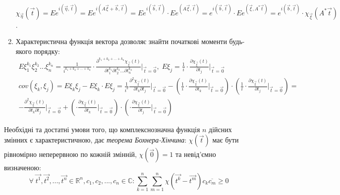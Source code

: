 \begin{enumerate}
    $\chi_{\vec{\eta}}(\vec{t}) = E e^{i(\vec{\eta}, \vec{t})} = E e^{i(A\vec{\xi} + \vec{b}, \vec{t})}=
    E e^{i(\vec{b}, \vec{t})} \cdot E e^{(A\vec{\xi}, \vec{t})} = e^{i(\vec{b}, \vec{t})} \cdot E e^{(\vec{\xi}, A^{*}\vec{t})} = e^{i(\vec{b}, \vec{t})} \cdot \chi_{\vec{\xi}}(A^{*}\vec{t})$.
    \item Характеристична функція вектора дозволяє знайти початкові моменти будь-якого порядку:
    \begin{gather*}
        E\xi_1^{k_1} \xi_2^{k_2} ... \xi_n^{k_n} = \frac{1}{i^{k_1 + k_2 + ... + k_n}} \cdot \frac{\partial^{k_1 + k_2 + ... + k_n}\chi_{\vec{\xi}}(t)}{\partial t_1^{k_1} \partial t_2^{k_2} ... \partial t_n^{k_n}} \Biggr \vert_{\vec{t} = \vec{0}}, 
        \; E\xi_j = \frac{1}{i} \cdot\frac{\partial \chi_{\vec{\xi}}(t)}{\partial t_j} \Biggr \vert_{\vec{t} = \vec{0}} \\
        {cov}(\xi_k, \xi_j) = E\xi_k\xi_j - E\xi_k\cdot E\xi_j = \frac{1}{i^2} \frac{\partial^2 \chi_{\vec{\xi}}(t)}{\partial t_k \partial t_j} \Biggr \vert_{\vec{t} = \vec{0}} - 
        \left( \frac{1}{i} \cdot\frac{\partial \chi_{\vec{\xi}}(t)}{\partial t_k} \Biggr \vert_{\vec{t} = \vec{0}}\right) \cdot \left( \frac{1}{i} \cdot\frac{\partial \chi_{\vec{\xi}}(t)}{\partial t_j} \Biggr \vert_{\vec{t} = \vec{0}}\right) = \\
        -\frac{\partial^2 \chi_{\vec{\xi}}(t)}{\partial t_k \partial t_j} \Biggr \vert_{\vec{t} = \vec{0}} + 
        \left(\cdot\frac{\partial \chi_{\vec{\xi}}(t)}{\partial t_k} \Biggr \vert_{\vec{t} = \vec{0}}\right) \cdot \left(\cdot\frac{\partial \chi_{\vec{\xi}}(t)}{\partial t_j} \Biggr \vert_{\vec{t} = \vec{0}}\right)\end{gather*}
\end{enumerate}

Необхідні та достатні умови того, що комплекснозначна функція $n$ дійсних змінних є характеристичною, дає
\emph{теорема Бохнера-Хінчина}: $\chi(\vec{t})$ має бути рівномірно неперервною по кожній змінній, $\chi(\vec{0}) = 1$ та 
невід'ємно визначеною: $$
    \forall \; \vec{t^1}, \vec{t^2}, ..., \vec{t^n} \in \mathbb{R}^n, c_1, c_2, ..., c_n \in \mathbb{C}: 
    \sum\limits_{k=1}^n {\sum\limits_{m=1}^n \chi(\vec{t^k} - \vec{t^m}) c_k \overline{c_m}} \geq 0$$